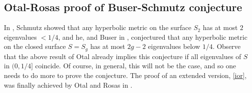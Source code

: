 \documentclass[a4paper,11pt]{amsart}
\numberwithin{equation}{section}
\theoremstyle{definition}
\begin{document}
\subsection{Otal-Rosas proof of Buser-Schmutz conjecture}\label{subsecor}

In \cite{S2}, Schmutz showed that any hyperbolic metric on the surface $S_2$ has at most $2$ eigenvalues $<1/4$, and he, and Buser in \cite{Bu1}, conjectured that any hyperbolic metric on the closed surface $S=S_g$ has at most $2g-2$ eigenvalues below $1/4$. 
Observe that the above result of Otal already implies this conjecture if all eigenvalues of $S$ in $(0,1/4]$ coincide.
Of course, in general, this will not be the case, and so one needs to do more to prove the conjecture.
The proof of an extended version, \cref{ior}, was finally achieved by Otal and Rosas in \cite{OR}. 
\end{document}
